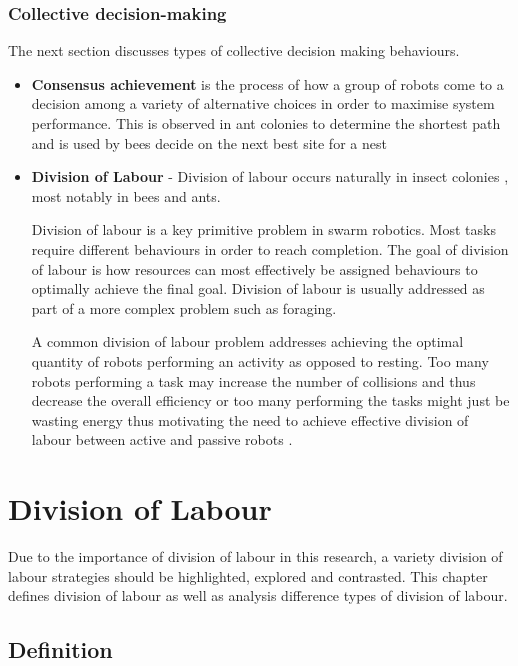 \subsubsection{Collective decision-making}
The next section discusses types of collective decision making behaviours. 

\begin{itemize}
	\item \textbf{Consensus achievement} is the process of how a group of robots come to a decision among a variety of alternative choices in order to maximise system performance. This is observed in ant colonies to determine the shortest path \cite{bonabeau2001self} and is used by bees decide on the next best site for a nest \cite{seeley2001nest}
	
	\item \textbf{Division of Labour} - Division of labour occurs naturally in insect colonies \cite{gautrais2002emergent}, most notably in bees and ants.

Division of labour is a key primitive problem in swarm robotics. Most tasks require different behaviours in order to reach completion. The goal of division of labour is how resources can most effectively be assigned behaviours to optimally achieve the final goal. Division of labour is usually addressed as part of a more complex problem such as foraging.
 
A common division of labour problem addresses achieving the optimal quantity of robots performing an activity as opposed to resting. Too many robots performing a task may increase the number of collisions and thus decrease the overall efficiency or too many performing the tasks might just be wasting energy thus motivating the need to achieve effective division of labour between active and passive robots \cite{jones2003adaptive, krieger2000call}.

\end{itemize}

\section{Division of Labour}

\label{chap:divisionoflabour}
Due to the importance of division of labour in this research, a variety division of labour strategies should be highlighted, explored and contrasted. This chapter defines division of labour as well as analysis difference types of division of labour.

\subsection{Definition}
\label{sec:second:definition}

